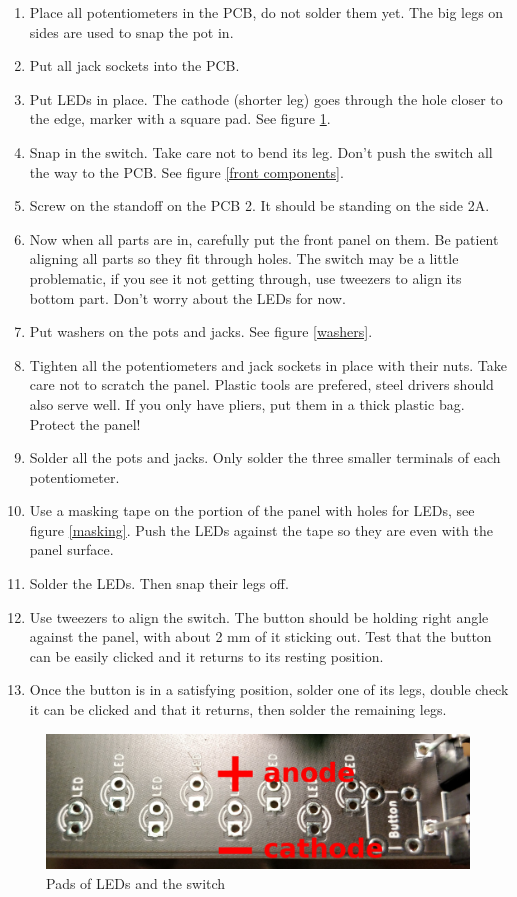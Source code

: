 \documentclass[10pt,a4paper,twocolumn]{article}
\begin{document}
\begin{enumerate}
  \item Place all potentiometers in the PCB, do not solder them yet. The big legs on sides are used to snap the pot in.
  \item Put all jack sockets into the PCB.
  \item Put LEDs in place. The cathode (shorter leg) goes through the hole closer to the edge, marker with a square pad. See figure \ref{led}.
  \item Snap in the switch. Take care not to bend its leg. Don't push the switch all the way to the PCB. See figure \ref{front components}.
  \item Screw on the standoff on the PCB 2. It should be standing on the side 2A.
  \item Now when all parts are in, carefully put the front panel on them. Be patient aligning all parts so they fit through holes. The switch may be a little problematic, if you see it not getting through, use tweezers to align its bottom part. Don't worry about the LEDs for now.
  \item Put washers on the pots and jacks. See figure \ref{washers}.
  \item Tighten all the potentiometers and jack sockets in place with their nuts. Take care not to scratch the panel. Plastic tools are prefered, steel drivers should also serve well. If you only have pliers, put them in a thick plastic bag. Protect the panel!
  \item Solder all the pots and jacks. Only solder the three smaller terminals of each potentiometer.
  \item Use a masking tape on the portion of the panel with holes for LEDs, see figure \ref{masking}. Push the LEDs against the tape so they are even with the panel surface.
  \item Solder the LEDs. Then snap their legs off.
  \item Use tweezers to align the switch. The button should be holding right angle against the panel, with about 2 mm of it sticking out. Test that the button can be easily clicked and it returns to its resting position.
  \item Once the button is in a satisfying position, solder one of its legs, double check it can be clicked and that it returns, then solder the remaining legs.
\end{enumerate}

\begin{figure}[p]
  \centering
  \includegraphics[width=\linewidth]{p06.jpg}
  \caption{Pads of LEDs and the switch}
  \label{led}
\end{figure}
\end{document}
